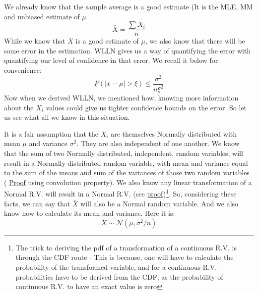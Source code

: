 We already know that the sample average is a good estimate (It is the MLE, MM and unbiased estimate of $\mu$ 
 	\[ \bar{X} = \frac{\sum X_i}{n} \]
While we know that $\bar{X}$ is a good estimate of $\mu$, we also know that there will be some error in the estimation. WLLN gives us a way of quantifying the error with quantifying our level of confidence in that error. We recall it below for convenience:
	\[ P(|\bar{x}-\mu| > \xi) \leq \frac{\sigma^2}{n\xi^2} \]
Now when we derived WLLN, we mentioned how, knowing more information about the $X_i$ values could give us tighter confidence bounds on the error. So let us see what all we know in this situation.

It is a fair assumption that the $X_i$ are themselves Normally distributed with mean $\mu$ and variance $\sigma^2$. They are also independent of one another. We know that the sum of two Normally distributed, independent, random variables, will result in a Normally distributed random variable, with mean and variance equal to the sum of the means and sum of the variances of those two random variables ( \href{https://en.wikipedia.org/wiki/Sum_of_normally_distributed_random_variables}{Proof}  using convolution property). We also know any linear transformation of a Normal R.V. will result in a Normal R.V. (see \href{https://www.probabilitycourse.com/chapter4/4_2_3_normal.php}{proof})\footnote{The trick to deriving the pdf of a transformation of a continuous R.V. is through the CDF route - This is because, one will have to calculate the probability of the transformed variable, and for a continuous R.V. probabilities have to be derived from the CDF, as the probability of continuous R.V. to have an exact value is zero}. So, considering these facts, we can say that $\bar{X}$ will also be a Normal random variable. And we also know how to calculate its mean and variance. Here it is:
	\[ \bar{X} \sim \mathcal{N}(\mu,\sigma^2/n) \]

